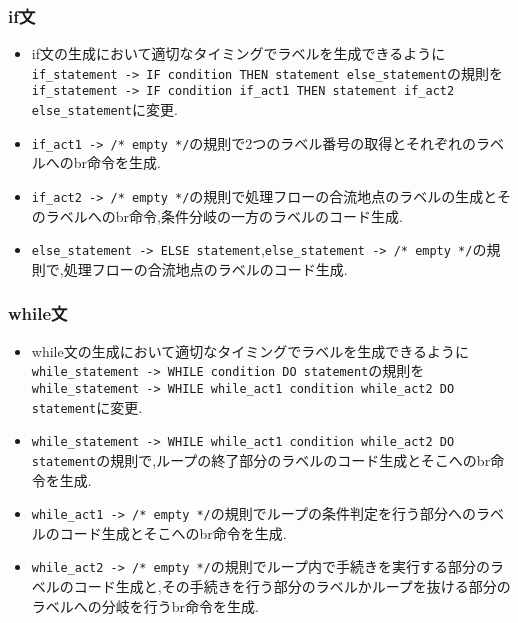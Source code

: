 \documentclass[main]{subfiles}
\begin{document}
\subsubsection{if文}
\begin{oframed}
\begin{itemize}
    \item if文の生成において適切なタイミングでラベルを生成できるように\verb|if_statement -> IF condition THEN statement else_statement|の規則を\verb|if_statement -> IF condition if_act1 THEN statement if_act2 else_statement|に変更.
    \item \verb|if_act1 -> /* empty */|の規則で2つのラベル番号の取得とそれぞれのラベルへのbr命令を生成.
    \item \verb|if_act2 -> /* empty */|の規則で処理フローの合流地点のラベルの生成とそのラベルへのbr命令,条件分岐の一方のラベルのコード生成.
    \item \verb|else_statement -> ELSE statement|,\verb|else_statement -> /* empty */|の規則で,処理フローの合流地点のラベルのコード生成.
\end{itemize}
\end{oframed}

\subsubsection{while文}
\begin{oframed}
\begin{itemize}
    \item while文の生成において適切なタイミングでラベルを生成できるように\verb|while_statement -> WHILE condition DO statement|の規則を\verb|while_statement -> WHILE while_act1 condition while_act2 DO statement|に変更.
    \item \verb|while_statement -> WHILE while_act1 condition while_act2 DO statement|の規則で,ループの終了部分のラベルのコード生成とそこへのbr命令を生成.
    \item \verb|while_act1 -> /* empty */|の規則でループの条件判定を行う部分へのラベルのコード生成とそこへのbr命令を生成.
    \item \verb|while_act2 -> /* empty */|の規則でループ内で手続きを実行する部分のラベルのコード生成と,その手続きを行う部分のラベルかループを抜ける部分のラベルへの分岐を行うbr命令を生成.
\end{itemize}
\end{oframed}
\end{document}
